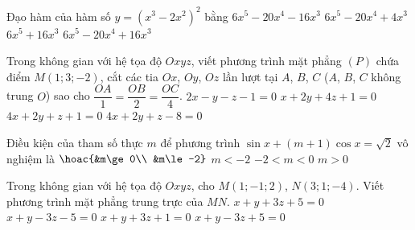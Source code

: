 \begin{ex}%
Đạo hàm của hàm số $y=\left( x^3-2x^2 \right)^2$ bằng
\choice
{$6x^5-20x^4-16x^3$}
{$6x^5-20x^4+4x^3$}
{$6x^5+16x^3$}
{\True $6x^5-20x^4+16x^3$}
\end{ex}

\begin{ex}%
Trong không gian với hệ tọa độ $Oxyz$, viết phương trình mặt phẳng $(P)$ chứa điểm $M(1;3;-2)$, cắt các tia $Ox$, $Oy$, $Oz$ lần lượt tại $A$, $B$, $C$ ($A$, $B$, $C$ không trung $O$) sao cho $\dfrac{OA}{1}=\dfrac{OB}{2}=\dfrac{OC}{4}$.
\choice
{$2x-y-z-1=0$}
{$x+2y+4z+1=0$}
{$4x+2y+z+1=0$}
{\True $4x+2y+z-8=0$}
\end{ex}

\begin{ex}%
Điều kiện của tham số thực $m$ để phương trình $\sin x+(m+1)\cos x=\sqrt{2}$ vô nghiệm là
\choice
{$\hoac{&m\ge 0\\ &m\le -2}$}
{$m<-2$}
{\True $-2<m<0$}
{$m>0$}
\end{ex}

\begin{ex}%
Trong không gian với hệ tọa độ $Oxyz$, cho $M(1;-1;2)$, $N(3;1;-4)$. Viết phương trình mặt phẳng trung trực của $MN$.
\choice
{$x+y+3z+5=0$}
{\True $x+y-3z-5=0$}
{$x+y+3z+1=0$}
{$x+y-3z+5=0$}
\end{ex}

